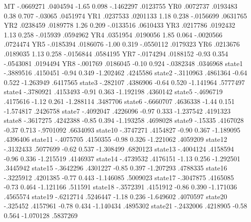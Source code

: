           MT {\VBAR}  -.0669271   .0404594    -1.65   0.098    -.1462297    .0123755
         YR0 {\VBAR}   .0072737   .0193483     0.38   0.707      -.03065    .0451974
         YR1 {\VBAR}   .0237533   .0201133     1.18   0.238    -.0156699    .0631765
         YR2 {\VBAR}   .0238459   .0189778     1.26   0.209    -.0133516    .0610433
         YR3 {\VBAR}   .0217786   .0192432     1.13   0.258     -.015939    .0594962
         YR4 {\VBAR}   .0351954   .0190056     1.85   0.064    -.0020566    .0724474
         YR5 {\VBAR}  -.0185394   .0186076    -1.00   0.319    -.0550112    .0179323
         YR6 {\VBAR}   .0213676   .0189035     1.13   0.258    -.0156844    .0584195
         YR7 {\VBAR}  -.0174294   .0188152    -0.93   0.354    -.0543081    .0194494
         YR8 {\VBAR}   -.001769   .0186045    -0.10   0.924    -.0382348    .0346968
      state1 {\VBAR}  -.3889516   .4150451    -0.94   0.349    -1.202462    .4245586
      state2 {\VBAR}  -.3110963   .4861364    -0.64   0.522    -1.263949    .6417565
      state3 {\VBAR}   -.282107   .4386906    -0.64   0.520    -1.141964    .5777497
      state4 {\VBAR}  -.3780921   .4153493    -0.91   0.363    -1.192198    .4360142
      state5 {\VBAR}  -.4696719   .4175616    -1.12   0.261    -1.288114    .3487706
      state6 {\VBAR}  -.6660707   .4636338    -1.44   0.151    -1.574817    .2426758
      state7 {\VBAR}  -.4092047   .4226096    -0.97   0.333    -1.237542    .4191323
      state8 {\VBAR}  -.3617275   .4242388    -0.85   0.394    -1.193258    .4698028
      state9 {\VBAR}    -.15335   .4167028    -0.37   0.713    -.9701092    .6634093
     state10 {\VBAR}  -.3747271   .4154827    -0.90   0.367    -1.189095    .4396406
     state11 {\VBAR}  -.4075705   .4150355    -0.98   0.326    -1.221062    .4059209
     state12 {\VBAR}  -.3132433   .5077699    -0.62   0.537    -1.308499    .6820123
     state13 {\VBAR}  -.4004124   .4158594    -0.96   0.336    -1.215519    .4146937
     state14 {\VBAR}  -.4739532   .4176151    -1.13   0.256    -1.292501    .3445942
     state15 {\VBAR}  -.3642296   .4301227    -0.85   0.397    -1.207293    .4788335
     state16 {\VBAR}  -.3225912   .4201385    -0.77   0.443    -1.146085    .5009023
     state17 {\VBAR}  -.3047875   .4165085    -0.73   0.464    -1.121166     .511591
     state18 {\VBAR}  -.3572391   .4151912    -0.86   0.390    -1.171036    .4565574
     state19 {\VBAR}  -.6212714   .5246447    -1.18   0.236    -1.649602    .4070597
     state20 {\VBAR}   -.325452   .4157961    -0.78   0.434    -1.140434    .4895302
     state21 {\VBAR}  -.2432006   .4218905    -0.58   0.564    -1.070128    .5837269
